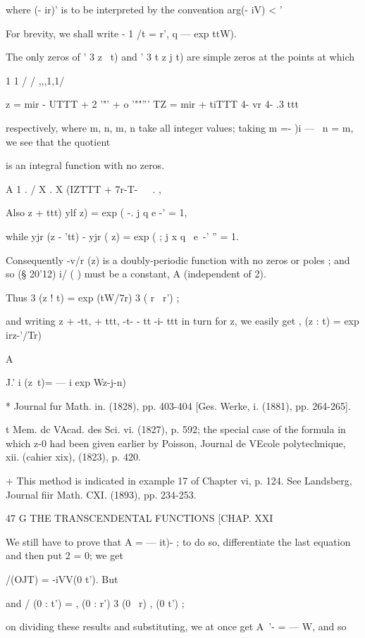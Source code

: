 where (- ir)' is to be interpreted by the convention arg(- iV) < '

For brevity, we shall write - 1 /t = r', q — exp ttW).

The only zeros of ' 3 z \ t) and ' 3 t z j t) are simple zeros at the
points at which

1 1 / / ,,,1,1/

z = mir - UTTT + 2 '"' + o '""''' TZ = mir + tiTTT 4- vr 4- .3 ttt

respectively, where m, n, m, n take all integer values; taking m =- )i
— \, n = m, we see that the quotient

is an integral function with no zeros.

A 1 . / X . X (IZTTT + 7r-T-\ \ \ . ,

Also z + ttt) ylf z) = exp ( -. j q e -' = 1,

while yjr (z - 'tt) - yjr ( z) = exp ( ; j x q~ e~-' '' = 1.

Consequently -v/r (z) is a doubly-periodic function with no zeros or
poles ; and so (§ 20'12) i/ ( ) must be a constant, A (independent of
2).

Thus 3 (z ! t) = exp (tW/7r) 3 ( r \ r') ;

and writing z + -tt, + ttt, -t- - tt -i- ttt in turn for z, we easily
get , (z : t) = exp irz-'/Tr) %

A%

J.' i (z\ t)= — i exp Wz-j-n) %

* Journal fur Math. in. (1828), pp. 403-404 [Ges. Werke, i. (1881),
pp. 264-265].

t Mem. dc VAcad. des Sci. vi. (1827), p. 592; the special case of the
formula in which z-0 had been given earlier by Poisson, Journal de
VEcole polyteclmique, xii. (cahier xix), (1823), p. 420.

+ This method is indicated in example 17 of Chapter vi, p. 124. See
Landsberg, Journal fiir Math. CXI. (1893), pp. 234-253.



47 G THE TRANSCENDENTAL FUNCTIONS [CHAP. XXI

We still have to prove that A = — it)- ; to do so, differentiate the
last equation and then put 2 = 0; we get

 /(OJT) = -iVV(0 t'). But %

and / (0 : t') = , (0 : r') 3 (0 \ r) , (0 t') ;

on dividing these results and substituting, we at once get A~'- = — W,
and so

